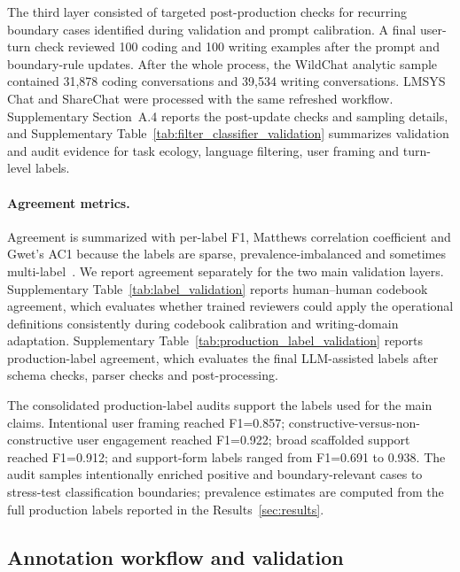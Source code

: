 The third layer consisted of targeted post-production checks for recurring boundary cases identified during validation and prompt calibration. A final user-turn check reviewed 100 coding and 100 writing examples after the prompt and boundary-rule
updates. After the whole process, the WildChat analytic sample contained 31,878 coding conversations and 39,534 writing conversations. LMSYS Chat and ShareChat were processed with the same refreshed workflow. Supplementary Section~A.4 reports the post-update checks and sampling details, and Supplementary Table~\ref{tab:filter_classifier_validation} summarizes validation and audit evidence for task ecology, language filtering, user framing and turn-level labels.

\paragraph{Agreement metrics.}
Agreement is summarized with per-label F1, Matthews correlation coefficient and Gwet's AC1 because the labels are sparse, prevalence-imbalanced and sometimes multi-label~\cite{matthews1975comparison,gwet2008computing}. We report agreement separately for the two main validation layers. Supplementary
Table~\ref{tab:label_validation} reports human--human codebook agreement, which evaluates whether trained reviewers could apply the operational definitions consistently
during codebook calibration and writing-domain adaptation. Supplementary Table~\ref{tab:production_label_validation} reports production-label agreement, which evaluates the final LLM-assisted labels after schema checks, parser checks and
post-processing.

The consolidated production-label audits support the labels used for the main claims. Intentional user framing reached F1=0.857; constructive-versus-non-constructive user
engagement reached F1=0.922; broad scaffolded support reached F1=0.912; and support-form labels ranged from F1=0.691 to 0.938. The audit samples intentionally enriched positive and boundary-relevant cases to stress-test classification boundaries; prevalence estimates are computed from the full production labels reported in the Results~\ref{sec:results}.
\fi

\subsection{Annotation workflow and validation}\label{subsec:annotation_workflow_validation}

